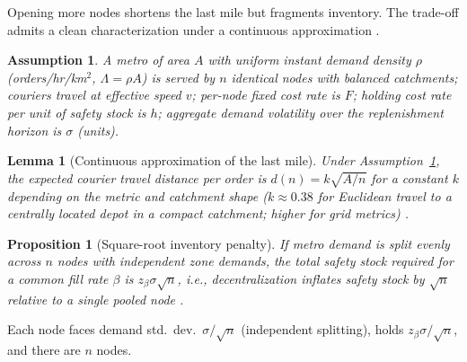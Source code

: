 \documentclass[journal]{IEEEtran}
\newtheorem{proposition}{Proposition}
\newtheorem{lemma}{Lemma}
\newtheorem{assumption}{Assumption}
\begin{document}
Opening more nodes shortens the last mile but fragments inventory. The trade-off admits a clean characterization under a continuous approximation \cite{daganzo,eppen}.

\begin{assumption}
\label{ass:continuum}
A metro of area $A$ with uniform instant demand density $\rho$ (orders/hr/km$^2$, $\Lambda = \rho A$) is served by $n$ identical nodes with balanced catchments; couriers travel at effective speed $v$; per-node fixed cost rate is $F$; holding cost rate per unit of safety stock is $h$; aggregate demand volatility over the replenishment horizon is $\sigma$ (units).
\end{assumption}

\begin{lemma}[Continuous approximation of the last mile]
\label{lem:ca}
Under Assumption~\ref{ass:continuum}, the expected courier travel distance per order is $d(n) = k \sqrt{A/n}$ for a constant $k$ depending on the metric and catchment shape ($k \approx 0.38$ for Euclidean travel to a centrally located depot in a compact catchment; higher for grid metrics) \cite{daganzo}.
\end{lemma}

\begin{proposition}[Square-root inventory penalty]
\label{prop:pooling}
If metro demand is split evenly across $n$ nodes with independent zone demands, the total safety stock required for a common fill rate $\beta$ is $z_\beta \sigma \sqrt{n}$, i.e., decentralization inflates safety stock by $\sqrt{n}$ relative to a single pooled node \cite{eppen}.
\end{proposition}
\begin{IEEEproof}
Each node faces demand std.\ dev.\ $\sigma/\sqrt{n}$ (independent splitting), holds $z_\beta \sigma / \sqrt{n}$, and there are $n$ nodes.
\end{IEEEproof}
\end{document}
